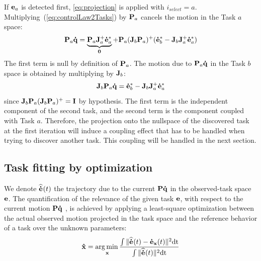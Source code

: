\documentclass[journal]{IEEEtran}
\begin{document}
If ${\mathbf{e}}_a$ is detected first, \eqref{eq:projection} is applied with
$i_{select} = a$. Multiplying~(\ref{eq:controlLaw2Tasks}) by ${\mathbf{P}}_a$
cancels the motion in the Task $a$ space:
\begin{equation}
  \mbf{P}_a \mbf{\dot{q}} = \underbrace{\mbf{P}_a \mbf{J}_a^+\mbf{\dot{e}}_a^*}_{\mbf{0}} + \mbf{P}_a (\mbf{J}_b\mbf{P}_a)^+ (\mbf{\dot{e}}_b^* - \mbf{J}_b\mbf{J}_a^+\mbf{\dot{e}}_a^*)  
  \label{eq:cancel1_2:1}
\end{equation}
The first term is null by definition of ${\mathbf{P}}_a$.
The motion due to ${\mathbf{P}}_a {\mathbf{\dot{q}}}$ in the Task $b$ space is obtained by multiplying by ${\mathbf{J}}_b$:
\begin{equation}
  \mbf{J}_b \mbf{P}_a \mbf{\dot{q}} = \mbf{\dot{e}}_b^* -
  \mbf{J}_b  \mbf{J}_a^+ \mbf{\dot{e}}_a^*  
  \label{eq:J2P1q}
\end{equation}
since ${\mathbf{J}}_b{\mathbf{P}}_a({\mathbf{J}}_b{\mathbf{P}}_a)^+ = {\mathbf{I}}$ by hypothesis.
The first term is the
independent component of the second task, and the second term
is the component coupled with Task $a$. 
Therefore, the projection onto the nullspace of the discovered task  at the 
first iteration will induce a coupling effect that has to be handled when trying to discover another task.
This coupling will be handled in the next section.


\newcommand{\medot}[1]{\mbf{\dot{e}}_{#1}}
\newcommand{\mqdot}{\mbf{\dot{q}}}
\newcommand{\mP}[1]{\mbf{P}_{#1}}
\newcommand{\mJ}[1]{\mbf{J}_{#1}}
\newcommand{\mJp}[1]{\mbf{J}_{#1}^+}
\newcommand{\medotc}[1]{\medot{#1}^*}
\newcommand{\medoth}[1]{\mbf{\widehat{\dot{e}}}_{#1}}
\newcommand{\medothp}[2]{\medoth{#1|#2}}

\subsection{Task fitting by optimization} \label{sec:alg2:proj}
We denote $\medoth{}(t)$ the trajectory due to the current ${\mathbf{P}}
{\mathbf{\dot{q}}}$ in the observed-task space ${\mathbf{e}}$.  The quantification of the
relevance of the given task ${\mathbf{e}}$, with respect to the current motion
${\mathbf{P}} {\mathbf{\dot{q}}}$ , is achieved by applying a least-square
optimization between the actual observed motion projected in the task space and
the reference behavior of a task over the unknown parameters:
\begin{equation}
  \mbf{\hat x} = \underset{\mbf{x}}\argmin \frac{\int \Vert \medoth{}(t) - \medot{\mbf x}(t) \Vert^2 \mathrm{dt}}{\int \Vert \medoth{}(t) \Vert^2 \mathrm{dt}}
\label{optimProblem}
\end{equation}
\end{document}
